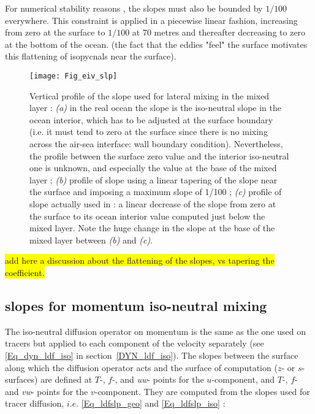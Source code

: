 \documentclass[NEMO_book]{subfiles}
\begin{document}
For numerical stability reasons \citep{Cox1987, Griffies_Bk04}, the slopes must also 
be bounded by $1/100$ everywhere. This constraint is applied in a piecewise linear 
fashion, increasing from zero at the surface to $1/100$ at $70$ metres and thereafter 
decreasing to zero at the bottom of the ocean. (the fact that the eddies "feel" the 
surface motivates this flattening of isopycnals near the surface).

\begin{figure}[!ht]     \begin{center}
\texttt{[image: Fig\_eiv\_slp]}
\caption {     \label{Fig_eiv_slp}
Vertical profile of the slope used for lateral mixing in the mixed layer : 
\textit{(a)} in the real ocean the slope is the iso-neutral slope in the ocean interior, 
which has to be adjusted at the surface boundary (i.e. it must tend to zero at the 
surface since there is no mixing across the air-sea interface: wall boundary 
condition). Nevertheless, the profile between the surface zero value and the interior 
iso-neutral one is unknown, and especially the value at the base of the mixed layer ; 
\textit{(b)} profile of slope using a linear tapering of the slope near the surface and 
imposing a maximum slope of 1/100 ; \textit{(c)} profile of slope actually used in 
\NEMO: a linear decrease of the slope from zero at the surface to its ocean interior 
value computed just below the mixed layer. Note the huge change in the slope at the 
base of the mixed layer between  \textit{(b)}  and \textit{(c)}.}
\end{center}   \end{figure}

\colorbox{yellow}{add here a discussion about the flattening of the slopes, vs  tapering the coefficient.}

\subsection{slopes for momentum iso-neutral mixing}

The iso-neutral diffusion operator on momentum is the same as the one used on 
tracers but applied to each component of the velocity separately (see 
\eqref{Eq_dyn_ldf_iso} in section~\ref{DYN_ldf_iso}). The slopes between the 
surface along which the diffusion operator acts and the surface of computation 
($z$- or $s$-surfaces) are defined at $T$-, $f$-, and \textit{uw}- points for the 
$u$-component, and $T$-, $f$- and \textit{vw}- points for the $v$-component. 
They are computed from the slopes used for tracer diffusion, $i.e.$ 
\eqref{Eq_ldfslp_geo} and \eqref{Eq_ldfslp_iso} :
\end{document}
